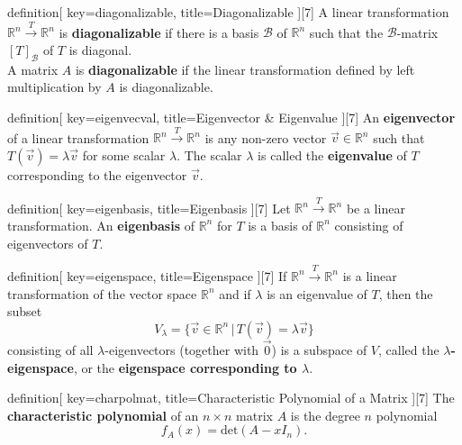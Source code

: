 \begin{SaveConcept}{definition}[
		key=diagonalizable,
		title={Diagonalizable}
	][7]
        A linear transformation $\mathbb R^n \overset{T}\longrightarrow \mathbb R^n$ is {\bf diagonalizable} if  there is a basis $\mathcal{B}$ of $\mathbb R^n$ such that the $\mathcal{B}$-matrix $[T]_{\mathcal{B}}$ of $T$ is diagonal.\\ A matrix $A$ is {\bf diagonalizable} if the linear transformation defined by left multiplication by $A$ is diagonalizable.
\end{SaveConcept}


\begin{SaveConcept}{definition}[
		key=eigenvecval,
		title={Eigenvector \& Eigenvalue}
	][7]
        An {\bf eigenvector} of a linear transformation  $\mathbb R^n \overset{T}\longrightarrow \mathbb R^n$ is any non-zero vector $\vec v \in \mathbb R^n$ such that $T(\vec v) = \lambda \vec v$ for some scalar $\lambda$. The scalar  $\lambda$ is called the {\bf eigenvalue} of $T$ corresponding to the eigenvector $\vec v$.
\end{SaveConcept}


\begin{SaveConcept}{definition}[
		key=eigenbasis,
		title={Eigenbasis}
	][7]
	Let $\mathbb R^n \overset{T}\longrightarrow \mathbb R^n$ be a linear transformation. An {\bf eigenbasis} of $\mathbb R^n$ for $T$ is a basis of $\mathbb R^n$ consisting of eigenvectors of $T$.
\end{SaveConcept}


\begin{SaveConcept}{definition}[
		key=eigenspace,
		title={Eigenspace}
	][7]
	If $\mathbb R^n \overset{T}\longrightarrow \mathbb R^n$ is a linear transformation of the vector space $\mathbb R^n$ and if $\lambda$ is an eigenvalue of $T$, then the subset
	$$
	V_{\lambda} = \{ \vec v \in \mathbb R^n \, | \, T(\vec v) = \lambda \vec v \} 
	$$
	consisting of all $\lambda$-eigenvectors (together with $\vec 0$) is a subspace of $V$, called the {\bf $\lambda$-eigenspace}, or the {\bf eigenspace corresponding to $\lambda$}.
\end{SaveConcept}


\begin{SaveConcept}{definition}[
		key=charpolmat,
		title={Characteristic Polynomial of a Matrix}
	][7]
	The {\bf characteristic polynomial} of an $n\times n$ matrix $A$ is the degree $n$ polynomial 
	$$
        f_A(x) =  \text{det} (A - xI_n).
        $$ 
\end{SaveConcept}


